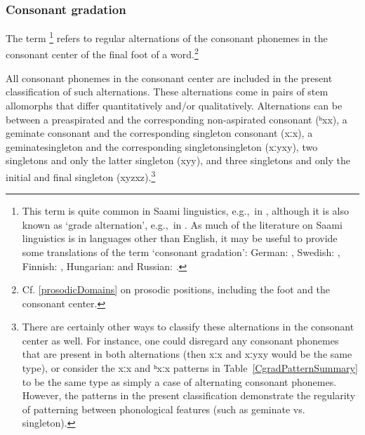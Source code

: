 \subsubsection{Consonant gradation}\label{Cgrad}
The term \footnote{This term is quite common in Saami linguistics, e.g.,~in \citet{Feist2010}, although it is also known as ‘grade alternation’, e.g.,~in \citet{Sammallahti1998}. As much of the literature on Saami linguistics is in languages other than English, it may be useful to provide some translations of the term ‘consonant gradation’: German: , Swedish: , Finnish: , Hungarian:  and Russian: .} 
refers to regular alternations of the consonant phonemes in the consonant center of the final foot of a word.\footnote{Cf. \SEC\ref{prosodicDomains} on prosodic positions, including the foot and the consonant center.} 

All consonant phonemes in the consonant center are included in the present classification of such alternations.
These alternations come in pairs of stem allomorphs that differ quantitatively and/or qualitatively. 
Alternations can be between a preaspirated and the corresponding non-aspirated consonant \mbox{(ʰx\Div x)},  
 a geminate consonant and the corresponding singleton consonant \mbox{(xː\Div x)}, 
 a geminate\PLUS singleton and the corresponding singleton\PLUS singleton \mbox{(xːy\Div xy)}, 
 two singletons and only the latter singleton \mbox{(xy\Div y)}, 
and  three singletons and only the initial and final singleton \mbox{(xyz\Div xz)}.\footnote{There are certainly other ways to classify these alternations in the consonant center as well. For instance, one could disregard any consonant phonemes that are present in both alternations (then \mbox{xː\Div x} and \mbox{xːy\Div xy} would be the same type), or consider the xː\Div x and ʰxː\Div x patterns in Table~\ref{CgradPatternSummary} to be the same type as simply a case of alternating consonant phonemes. However, the patterns in the present classification demonstrate the regularity of patterning between phonological features (such as geminate vs. singleton).}  


